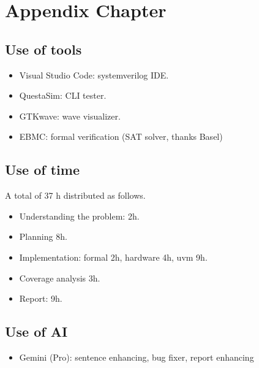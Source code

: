 \appendix
\chapter{Appendix Chapter}

\section{Use of tools}

\begin{itemize}
    \item Visual Studio Code: systemverilog IDE.
    \item QuestaSim: CLI tester.
    \item GTKwave: wave visualizer.
    \item EBMC: formal verification (SAT solver, thanks Basel)
\end{itemize}

\section{Use of time}

A total of 37 h distributed as follows.

\begin{itemize}
    \item Understanding the problem: 2h.
    \item Planning 8h.
    \item Implementation: formal 2h, hardware 4h, uvm 9h.
    \item Coverage analysis 3h.
    \item Report: 9h.
\end{itemize}

\section{Use of AI}

\begin{itemize}
    \item Gemini (Pro): sentence enhancing, bug fixer, report enhancing
\end{itemize}

